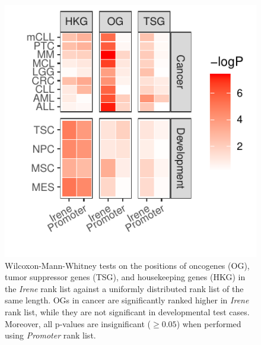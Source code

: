 \documentclass[a4paper,12pt]{article}
\begin{document}
\begin{figure}[!htb]
\centering
\includegraphics[scale=1.25]{figs/oncoRank.pdf}
\caption{ Wilcoxon-Mann-Whitney tests on the positions of oncogenes (OG), tumor suppressor genes (TSG), and housekeeping genes (HKG) in the {\em Irene} rank list against a uniformly distributed rank list of the same length. OGs in cancer are significantly ranked higher in {\em Irene} rank list, while they are not significant in developmental test cases. Moreover, all p-values are insignificant ($\geq 0.05$) when performed using {\em Promoter} rank list. }
\label{fig:og}
\end{figure}
\end{document}
